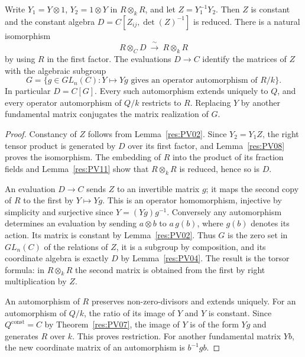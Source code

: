 \begin{theorem}
\label{res:PV12}
Write \(Y_1=Y\otimes1\), \(Y_2=1\otimes Y\) in \(R\otimes_k R\),
and let \(Z=Y_1^{-1}Y_2\). Then \(Z\) is constant and the
constant algebra \(D=C[Z_{ij},\det(Z)^{-1}]\) is reduced. There
is a natural isomorphism
\[
 R\otimes_C D \ \xrightarrow{\ \sim\ }\ R\otimes_k R
\]
by using \(R\) in the first factor. The evaluations \(D\to C\)
identify the matrices of \(Z\) with the algebraic subgroup
\[
 G=\{g\in GL_n(C):Y\mapsto Yg
                   \text{ gives an operator automorphism of }R/k\}.
\]
In particular \(D=C[G]\). Every such automorphism extends uniquely
to \(Q\), and every operator automorphism of \(Q/k\) restricts to
\(R\). Replacing \(Y\) by another fundamental matrix conjugates
the matrix realization of \(G\).
\end{theorem}

\begin{proof}
Constancy of \(Z\) follows from Lemma~\ref{res:PV02}. Since
\(Y_2=Y_1Z\), the right tensor product is generated by \(D\)
over its first factor, and Lemma~\ref{res:PV08} proves the
isomorphism. The embedding of \(R\) into the product of its
fraction fields and Lemma~\ref{res:PV11} show that
\(R\otimes_k R\) is reduced, hence so is \(D\).

An evaluation \(D\to C\) sends \(Z\) to an invertible matrix \(g\);
it maps the second copy of \(R\) to the first by \(Y\mapsto Yg\).
This is an operator homomorphism, injective by simplicity and
surjective since \(Y=(Yg)g^{-1}\). Conversely any automorphism
determines an evaluation by sending \(a\otimes b\) to \(a\,g(b)\),
where \(g(b)\) denotes its action. Its matrix is constant by
Lemma~\ref{res:PV02}. Thus \(G\) is the zero set in \(GL_n(C)\)
of the relations of \(Z\), it is a subgroup by composition,
and its coordinate algebra is exactly \(D\) by
Lemma~\ref{res:PV04}. The result is the torsor formula: in
\(R\otimes_k R\) the second matrix is obtained from the first by
right multiplication by \(Z\).

An automorphism of \(R\) preserves non-zero-divisors and
extends uniquely. For an automorphism of \(Q/k\), the ratio of its
image of \(Y\) and \(Y\) is constant. Since \(Q^{\mathrm{const}}=C\)
by Theorem~\ref{res:PV07}, the image of \(Y\) is of the form \(Yg\)
and generates \(R\) over \(k\). This proves restriction. For
another fundamental matrix \(Yb\), the new coordinate matrix of
an automorphism is \(b^{-1}gb\).
\end{proof}

